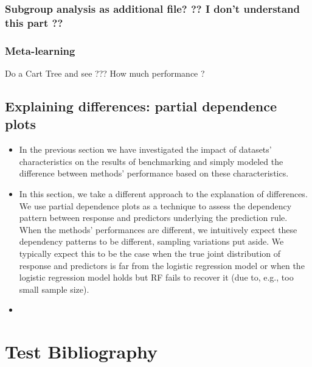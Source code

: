 \documentclass[12pt]{article}
\begin{document}
\subsubsection{Subgroup analysis as additional file?  \textbf{?? I don't understand this part ??}}

\subsubsection{Meta-learning}

Do a Cart Tree and see ??? How much performance ?



\subsection{Explaining differences: partial dependence plots}
\begin{itemize}
\item In the previous section we have investigated the impact of datasets' characteristics on the results of benchmarking and simply modeled the difference between methods' performance based on these characteristics. 
\item In this section, we take a different approach to the explanation of differences. We use partial dependence plots as a technique to assess the dependency pattern between response and predictors underlying the prediction rule. When the methods' performances are different, we intuitively expect these dependency patterns to be different, sampling variations put aside. We typically expect this to be the case when the true joint distribution of response and predictors is far from the logistic regression model or when the logistic regression model holds but RF fails to recover it (due to, e.g., too small sample size). 
\item 
\end{itemize}

\newpage
\section{Test Bibliography}


\end{document}
